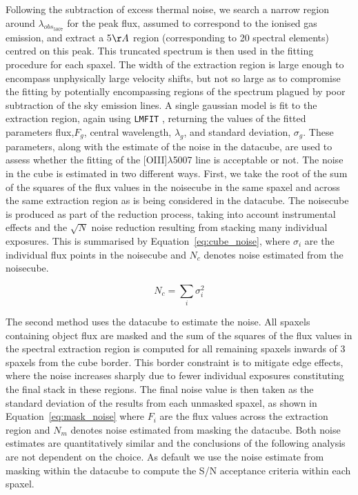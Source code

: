 \documentclass[fleqn,usenatbib]{mn2e}
\begin{document}
Following the subtraction of excess thermal noise, we search a narrow region around $\lambda_{obs_{5007}}$ for the peak flux, assumed to correspond to the ionised gas emission, and extract a 5$\AA$ region (corresponding to 20 spectral elements) centred on this peak.
This truncated spectrum is then used in the fitting procedure for each spaxel.
The width of the extraction region is large enough to encompass unphysically large velocity shifts, but not so large as to compromise the fitting by potentially encompassing regions of the spectrum plagued by poor subtraction of the sky emission lines.
A single gaussian model is fit to the extraction region, again using {\tt LMFIT} \citep{Newville2014}, returning the values of the fitted parameters flux,$F_{g}$, central wavelength, $\lambda_{g}$, and standard deviation, $\sigma_{g}$.
These parameters, along with the estimate of the noise in the datacube, are used to assess whether the fitting of the [OIII]$\lambda$5007 line is acceptable or not. 
The noise in the cube is estimated in two different ways. 
First, we take the root of the sum of the squares of the flux values in the noisecube in the same spaxel and across the same extraction region as is being considered in the datacube.
The noisecube is produced as part of the reduction process, taking into account instrumental effects and the $\sqrt{N}$ noise reduction resulting from stacking many individual exposures.
This is summarised by Equation~\ref{eq:cube_noise}, where $\sigma _{i}$ are the individual flux points in the noisecube and $N_{c}$ denotes noise estimated from the noisecube.

\begin{equation}\label{eq:cube_noise}
   N_{c} = \sum_{i}\sigma _{i}^{2}
\end{equation}

The second method uses the datacube to estimate the noise.
All spaxels containing object flux are masked and the sum of the squares of the flux values in the spectral extraction region is computed for all remaining spaxels inwards of 3 spaxels from the cube border.
This border constraint is to mitigate edge effects, where the noise increases sharply due to fewer individual exposures constituting the final stack in these regions.
The final noise value is then taken as the standard deviation of the results from each unmasked spaxel, as shown in Equation~\ref{eq:mask_noise} where $F_{i}$ are the flux values across the extraction region and $N_{m}$ denotes noise estimated from masking the datacube.
Both noise estimates are quantitatively similar and the conclusions of the following analysis are not dependent on the choice.
As default we use the noise estimate from masking within the datacube to compute the S/N acceptance criteria within each spaxel.
\end{document}
